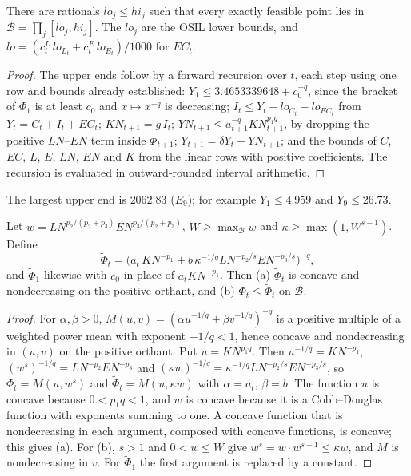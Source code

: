 \begin{lemma}\label{lem:etamac-box}
There are rationals $lo_j\le hi_j$ such that every exactly feasible point lies in $\mathcal B=\prod_j[lo_j,hi_j]$.
The $lo_j$ are the OSIL lower bounds, and $lo=(c^L_t\,lo_{L_t}+c^E_t\,lo_{E_t})/1000$ for $E\!C_t$.
\end{lemma}

\begin{proof}
The upper ends follow by a forward recursion over $t$, each step using one row and bounds already established:
$Y_1\le3.4653339648+c_0^{-q}$, since the bracket of $\Phi_1$ is at least $c_0$ and $x\mapsto x^{-q}$ is decreasing;
$I_t\le Y_t-lo_{C_t}-lo_{E\!C_t}$ from $Y_t=C_t+I_t+E\!C_t$;
$K\!N_{t+1}=g\,I_t$;
$Y\!N_{t+1}\le a_{t+1}^{-q}K\!N_{t+1}^{p_1q}$, by dropping the positive $L\!N$--$E\!N$ term inside $\Phi_{t+1}$;
$Y_{t+1}=\delta Y_t+Y\!N_{t+1}$;
and the bounds of $C$, $E\!C$, $L$, $E$, $L\!N$, $E\!N$ and $K$ from the linear rows with positive coefficients.
The recursion is evaluated in outward-rounded interval arithmetic.
\end{proof}

The largest upper end is $2062.83$ ($E_9$); for example $Y_1\le4.959$ and $Y_9\le26.73$.

\begin{lemma}\label{lem:etamac-majorant}
Let $w=L\!N^{p_2/(p_2+p_3)}E\!N^{p_3/(p_2+p_3)}$, $W\ge\max_{\mathcal B}w$ and $\kappa\ge\max(1,W^{s-1})$.
Define
\[
\tilde\Phi_t=\bigl(a_t\,K\!N^{-p_1}+b\,\kappa^{-1/q}L\!N^{-p_2/s}E\!N^{-p_3/s}\bigr)^{-q},
\]
and $\tilde\Phi_1$ likewise with $c_0$ in place of $a_tKN^{-p_1}$.
Then (a) $\tilde\Phi_t$ is concave and nondecreasing on the positive orthant, and (b) $\Phi_t\le\tilde\Phi_t$ on $\mathcal B$.
\end{lemma}

\begin{proof}
For $\alpha,\beta>0$, $M(u,v)=(\alpha u^{-1/q}+\beta v^{-1/q})^{-q}$ is a positive multiple of a weighted power mean with exponent $-1/q<1$,
hence concave and nondecreasing in $(u,v)$ on the positive orthant.
Put $u=K\!N^{p_1q}$.
Then $u^{-1/q}=K\!N^{-p_1}$, $(w^s)^{-1/q}=L\!N^{-p_2}E\!N^{-p_3}$ and $(\kappa w)^{-1/q}=\kappa^{-1/q}L\!N^{-p_2/s}E\!N^{-p_3/s}$,
so $\Phi_t=M(u,w^s)$ and $\tilde\Phi_t=M(u,\kappa w)$ with $\alpha=a_t$, $\beta=b$.
The function $u$ is concave because $0<p_1q<1$, and $w$ is concave because it is a Cobb--Douglas function with exponents summing to one.
A concave function that is nondecreasing in each argument, composed with concave functions, is concave; this gives (a).
For (b), $s>1$ and $0<w\le W$ give $w^s=w\cdot w^{s-1}\le\kappa w$, and $M$ is nondecreasing in $v$.
For $\tilde\Phi_1$ the first argument is replaced by a constant.
\end{proof}

